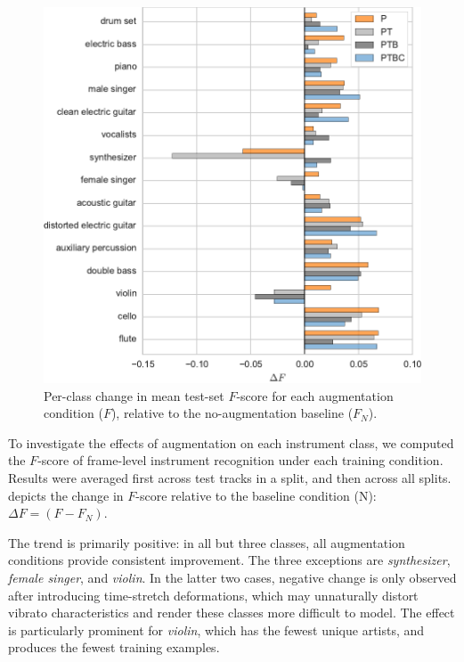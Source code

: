 \documentclass{article}
\begin{document}
\begin{figure}[t]
    \centering
    \includegraphics[width=0.9\columnwidth]{figs/fscore-improvement}
    \vspace{-\baselineskip}
    \caption{Per-class change in mean test-set $F$-score for each augmentation condition
        ($F$), relative to the no-augmentation baseline ($F_N$).\label{fscore}}
\end{figure}

To investigate the effects of augmentation on each instrument class,
we computed the $F$-score of frame-level instrument recognition under 
each training condition.  Results were averaged first
across test tracks in a split, and then across all splits.
 depicts the change in $F$-score relative to the baseline
condition (N): $\Delta F = (F - F_N)$.

The trend is primarily positive: in all but three classes, all augmentation
conditions provide consistent improvement.  
The three exceptions are \emph{synthesizer}, \emph{female singer},
and \emph{violin}.
In the latter two cases, negative change is only observed after introducing time-stretch
deformations, which may unnaturally distort vibrato characteristics and
render these classes more difficult to model.
The effect is particularly prominent for \emph{violin}, which has the fewest unique
artists, and produces the fewest training examples.
\end{document}
